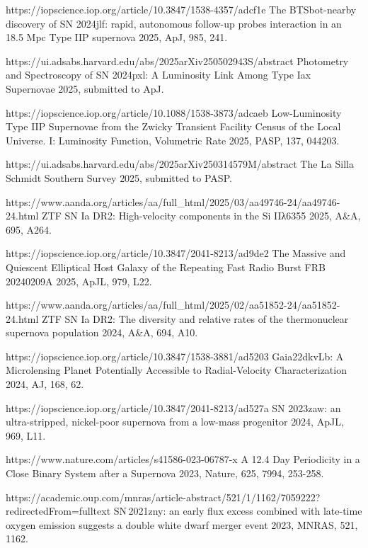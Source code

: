 \begin{cvpubs}
{\begin{cvitems}
    {\Cliu}
    {https://iopscience.iop.org/article/10.3847/1538-4357/adcf1e}
    {The BTSbot-nearby discovery of SN 2024jlf: rapid, autonomous follow-up probes interaction in an 18.5 Mpc Type IIP supernova}
    {2025, ApJ, 985, 241.}
    \item {}
    {\Cliu}
    {https://ui.adsabs.harvard.edu/abs/2025arXiv250502943S/abstract}
    {Photometry and Spectroscopy of SN 2024pxl: A Luminosity Link Among Type Iax Supernovae}
    {2025, submitted to ApJ.}
    \item {}
    {\Cliu}
    {https://iopscience.iop.org/article/10.1088/1538-3873/adcaeb}
    {Low-Luminosity Type IIP Supernovae from the Zwicky Transient Facility Census of the Local Universe. I: Luminosity Function, Volumetric Rate}
    {2025, PASP, 137, 044203.}
    \item {}
    {\Cliu}
    {https://ui.adsabs.harvard.edu/abs/2025arXiv250314579M/abstract}
    {The La Silla Schmidt Southern Survey}
    {2025, submitted to PASP.}
    \item {}
    {\Cliu}
    {https://www.aanda.org/articles/aa/full_html/2025/03/aa49746-24/aa49746-24.html}
    {ZTF SN Ia DR2: High-velocity components in the Si IIλ6355}
    {2025, A\&A, 695, A264.}
    \item {}
    {\Cliu}
    {https://iopscience.iop.org/article/10.3847/2041-8213/ad9de2}
    {The Massive and Quiescent Elliptical Host Galaxy of the Repeating Fast Radio Burst FRB 20240209A}
    {2025, ApJL, 979, L22.}
    \item {}
    {\Cliu}
    {https://www.aanda.org/articles/aa/full_html/2025/02/aa51852-24/aa51852-24.html}
    {ZTF SN Ia DR2: The diversity and relative rates of the thermonuclear supernova population}
    {2024, A\&A, 694, A10.}
    \item {} 
    {\Cliu}
    {https://iopscience.iop.org/article/10.3847/1538-3881/ad5203}
    {Gaia22dkvLb: A Microlensing Planet Potentially Accessible to Radial-Velocity Characterization}
    {2024, AJ, 168, 62.}
    \item {} 
    {\Cliu}
    {https://iopscience.iop.org/article/10.3847/2041-8213/ad527a}
    {SN 2023zaw: an ultra-stripped, nickel-poor supernova from a low-mass progenitor}
    {2024, ApJL, 969, L11.}
    \item {} 
    {\Cliu}
    {https://www.nature.com/articles/s41586-023-06787-x}
    {A 12.4 Day Periodicity in a Close Binary System after a Supernova}
    {2023, Nature, 625, 7994, 253-258.}
    \item {} 
    {\Cliu}
    {https://academic.oup.com/mnras/article-abstract/521/1/1162/7059222?redirectedFrom=fulltext}
    {SN\,2021zny: an early flux excess combined with late-time oxygen emission suggests a double white dwarf merger event}
    {2023, MNRAS, 521, 1162.}
\end{cvitems}
}


\end{cvpubs}
